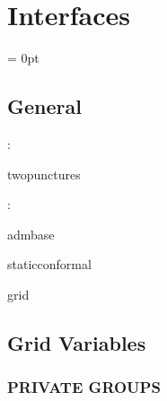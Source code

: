 
\section{Interfaces} 


\parskip = 0pt

\vspace{3mm} \subsection*{General}

: 

twopunctures
\vspace{2mm}

: 

admbase

staticconformal

grid
\vspace{2mm}
\subsection*{Grid Variables}
\vspace{5mm}\subsubsection{PRIVATE GROUPS}

\vspace{5mm}

